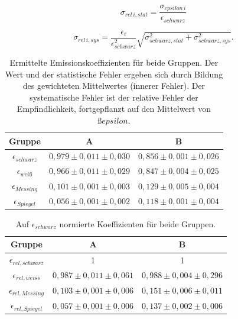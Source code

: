 \documentclass[12pt,a4paper]{article}
\begin{document}
\begin{equation}
\sigma_{rel \,i, stat} = \frac{\sigma_{epsilon \,i}}{\epsilon_{schwarz}}
\end{equation}

\begin{equation}
\sigma_{rel \,i, sys} = \frac{\epsilon_{i}}{\epsilon_{schwarz}^2} \sqrt{\sigma_{schwarz, stat}^2 + \sigma_{schwarz, sys}^2}.
\end{equation}


\begin{table}
\centering
\begin{tabular}{|c|c|c|}
\hline
Gruppe & A & B \\
\hline
$\epsilon_{schwarz}$ & $ 0,979 \pm 0,011 \pm 0,030 $ & $ 0,856 \pm 0,001 \pm 0,026 $ \\
\hline
$\epsilon_{weiß}$ & $ 0,966 \pm 0,011 \pm 0,029 $ & $ 0,847 \pm 0,004 \pm 0,025 $ \\
\hline
$\epsilon_{Messing}$ & $ 0,101 \pm  0,001 \pm 0,003 $ & $ 0,129 \pm 0,005 \pm 0,004 $ \\
\hline
$\epsilon_{Spiegel}$ & $ 0,056 \pm 0,001 \pm 0,002 $ & $ 0,118 \pm 0,001 \pm 0,004 $ \\
\hline
\end{tabular}
\caption{Ermittelte Emissionskoeffizienten für beide Gruppen. Der Wert und der statistische Fehler ergeben sich durch Bildung des gewichteten Mittelwertes (innerer Fehler). Der systematische Fehler ist der relative Fehler der Empfindlichkeit, fortgepflanzt auf den Mittelwert von $ßepsilon$.}
\label{tab:Emission}
\end{table}

\begin{table}
\centering
\begin{tabular}{|c|c|c|}
\hline
Gruppe & A & B \\
\hline
$\epsilon_{rel,schwarz}$ & 1 & 1 \\
\hline
$\epsilon_{rel,weiss}$ & $ 0,987 \pm 0,011 \pm 0,061 $ & $ 0,988 \pm 0,004 \pm 0,296 $ \\
\hline
$\epsilon_{rel,Messing}$ & $ 0,103 \pm 0,001 \pm 0,006 $ & $ 0,151 \pm 0,006 \pm 0,011$ \\
\hline
$\epsilon_{rel,Spiegel}$ & $ 0,057 \pm 0,001 \pm 0,006 $ & $ 0,137 \pm 0,002 \pm 0,006$ \\
\hline
\end{tabular}
\caption{Auf $\epsilon_{schwarz}$ normierte Koeffizienten für beide Gruppen.}
\label{tab:Emission_relativ}
\end{table}
\end{document}
